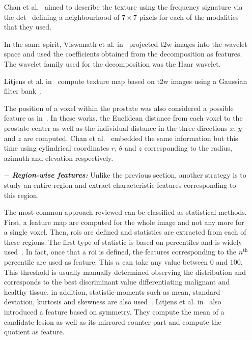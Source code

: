 \begin{enumerate}[leftmargin=*]
  Chan et al.~\cite{Chan2003} aimed to describe the texture using the frequency signature via the \acf{dct}~\cite{Ahmed1974} defining a neighbourhood of $7 \times 7$ pixels for each of the modalities that they used.

  In the same spirit, Viswanath et al. in~\cite{Viswanath2012} projected \ac{t2w} images into the wavelet space and used the coefficients obtained from the decomposition as features. The wavelet family used for the decomposition was the Haar wavelet.

  Litjens et al. in~\cite{Litjens2014} compute texture map based on \ac{t2w} images using a Gaussian filter bank~\cite{Leung2001}.

  The position of a voxel within the prostate was also considered a possible feature as in~\cite{Litjens2011,Litjens2014}. In these works, the Euclidean distance from each voxel to the prostate center as well as the individual distance in the three directions $x$, $y$ and $z$ are computed. Chan et al.~\cite{Chan2003} embedded the same information but this time using cylindrical coordinates $r$, $\theta$ and $z$ corresponding to the radius, azimuth and elevation respectively.

\item[$-$] \textbf{\textit{Region-wise features:}} Unlike the previous section, another strategy is to study an entire region and extract characteristic features corresponding to this region.

  The most common approach reviewed can be classified as statistical methods. First, a feature map are computed for the whole image and not any more for a single voxel. Then, \acp{roi} are defined and statistics are extracted from each of these regions. The first type of statistic is based on percentiles and is widely used~\cite{Antic2013,Litjens2011,Litjens2012,Litjens2014,Peng2013,Tiwari2009a,Tiwari2010,Tiwari2013,Viswanath2008,Viswanath2008a,Viswanath2011,Viswanath2012,Vos2008,Vos2008a,Vos2010,Vos2012}. In fact, once that a \ac{roi} is defined, the features corresponding to the $n^{\text{th}}$ percentile are used as feature. This $n$ can take any value between $0$ and $100$. This threshold is usually manually determined observing the distribution and corresponds to the best discriminant value differentiating malignant and healthy tissue. in addition, statistic-moments such as mean, standard deviation, kurtosis and skewness are also used~\cite{Ampeliotis2007,Ampeliotis2008,Antic2013,Niaf2011,Niaf2012,Peng2013}. Litjens et al. in~\cite{Litjens2014} also introduced a feature based on symmetry. They compute the mean of a candidate lesion as well as its mirrored counter-part and compute the quotient as feature.


\end{enumerate}
